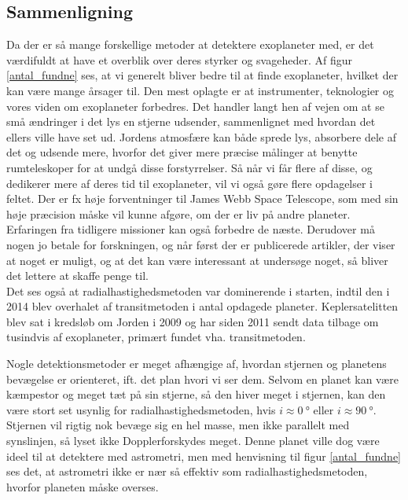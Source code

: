\subsection*{Sammenligning}
Da der er så mange forskellige metoder at detektere exoplaneter med, er det værdifuldt at have et overblik over deres styrker og svageheder. Af figur \ref{antal_fundne} ses, at vi generelt bliver bedre til at finde exoplaneter, hvilket der kan være mange årsager til. Den mest oplagte er at instrumenter, teknologier og vores viden om exoplaneter forbedres. Det handler langt hen af vejen om at se små ændringer i det lys en stjerne udsender, sammenlignet med hvordan det ellers ville have set ud. Jordens atmosfære kan både sprede lys, absorbere dele af det og udsende mere, hvorfor det giver mere præcise målinger at benytte rumteleskoper for at undgå disse forstyrrelser. Så når vi får flere af disse, og dedikerer mere af deres tid til exoplaneter, vil vi også gøre flere opdagelser i feltet. Der er fx høje forventninger til James Webb Space Telescope, som med sin høje præcision måske vil kunne afgøre, om der er liv på andre planeter.  %
Erfaringen fra tidligere missioner kan også forbedre de næste. Derudover må nogen jo betale for forskningen, og når først der er publicerede artikler, der viser at noget er muligt, og at det kan være interessant at undersøge noget, så bliver det lettere at skaffe penge til. \\ %

Det ses også at radialhastighedsmetoden var dominerende i starten, indtil den i 2014 blev overhalet af transitmetoden i antal opdagede planeter. %
Keplersatelitten blev sat i kredsløb om Jorden i 2009 og har siden 2011 sendt data tilbage om tusindvis af exoplaneter, primært fundet vha. transitmetoden. %

Nogle detektionsmetoder er meget afhængige af, hvordan stjernen og planetens bevægelse er orienteret, ift. det plan hvori vi ser dem. Selvom en planet kan være kæmpestor og meget tæt på sin stjerne, så den hiver meget i stjernen, kan den være stort set usynlig for radialhastighedsmetoden, hvis $i\approx\SI{0}{\degree}$ eller $i\approx\SI{90}{\degree}$. Stjernen vil rigtig nok bevæge sig en hel masse, men ikke parallelt med synslinjen, så lyset ikke Dopplerforskydes meget. Denne planet ville dog være ideel til at detektere med astrometri, men med henvisning til figur \ref{antal_fundne} ses det, at astrometri ikke er nær så effektiv som radialhastighedsmetoden, hvorfor planeten måske overses. \\

